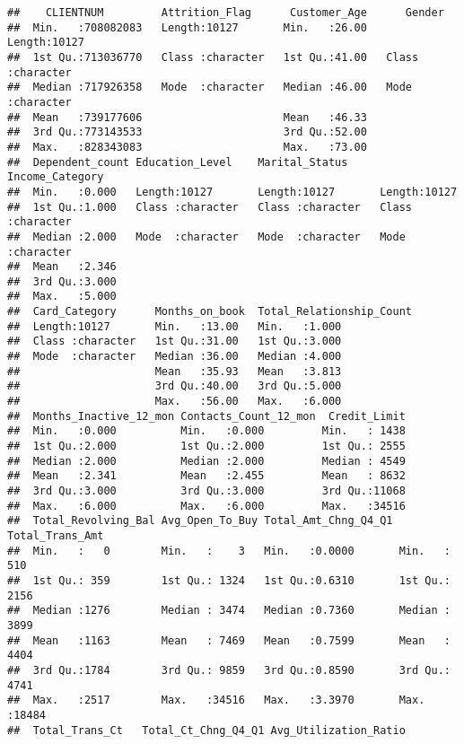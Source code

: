 \documentclass[]{article}
\begin{document}
\begin{verbatim}
##    CLIENTNUM         Attrition_Flag      Customer_Age      Gender         
##  Min.   :708082083   Length:10127       Min.   :26.00   Length:10127      
##  1st Qu.:713036770   Class :character   1st Qu.:41.00   Class :character  
##  Median :717926358   Mode  :character   Median :46.00   Mode  :character  
##  Mean   :739177606                      Mean   :46.33                     
##  3rd Qu.:773143533                      3rd Qu.:52.00                     
##  Max.   :828343083                      Max.   :73.00                     
##  Dependent_count Education_Level    Marital_Status     Income_Category   
##  Min.   :0.000   Length:10127       Length:10127       Length:10127      
##  1st Qu.:1.000   Class :character   Class :character   Class :character  
##  Median :2.000   Mode  :character   Mode  :character   Mode  :character  
##  Mean   :2.346                                                           
##  3rd Qu.:3.000                                                           
##  Max.   :5.000                                                           
##  Card_Category      Months_on_book  Total_Relationship_Count
##  Length:10127       Min.   :13.00   Min.   :1.000           
##  Class :character   1st Qu.:31.00   1st Qu.:3.000           
##  Mode  :character   Median :36.00   Median :4.000           
##                     Mean   :35.93   Mean   :3.813           
##                     3rd Qu.:40.00   3rd Qu.:5.000           
##                     Max.   :56.00   Max.   :6.000           
##  Months_Inactive_12_mon Contacts_Count_12_mon  Credit_Limit  
##  Min.   :0.000          Min.   :0.000         Min.   : 1438  
##  1st Qu.:2.000          1st Qu.:2.000         1st Qu.: 2555  
##  Median :2.000          Median :2.000         Median : 4549  
##  Mean   :2.341          Mean   :2.455         Mean   : 8632  
##  3rd Qu.:3.000          3rd Qu.:3.000         3rd Qu.:11068  
##  Max.   :6.000          Max.   :6.000         Max.   :34516  
##  Total_Revolving_Bal Avg_Open_To_Buy Total_Amt_Chng_Q4_Q1 Total_Trans_Amt
##  Min.   :   0        Min.   :    3   Min.   :0.0000       Min.   :  510  
##  1st Qu.: 359        1st Qu.: 1324   1st Qu.:0.6310       1st Qu.: 2156  
##  Median :1276        Median : 3474   Median :0.7360       Median : 3899  
##  Mean   :1163        Mean   : 7469   Mean   :0.7599       Mean   : 4404  
##  3rd Qu.:1784        3rd Qu.: 9859   3rd Qu.:0.8590       3rd Qu.: 4741  
##  Max.   :2517        Max.   :34516   Max.   :3.3970       Max.   :18484  
##  Total_Trans_Ct   Total_Ct_Chng_Q4_Q1 Avg_Utilization_Ratio

\end{verbatim}
\end{document}
